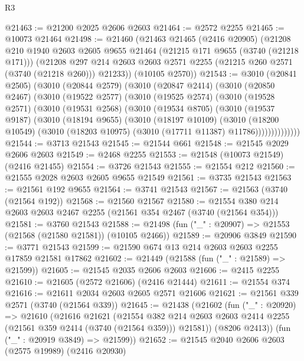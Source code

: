 \begin{lexlean}{R3}
\begin{coremodule}
@21463 := @21200 @2025 @2606 @2603
@21464 := @2572 @2255
@21465 := @10073 @21464
@21498 := @21460
    (@21463
      @21465
      (@2416 @20905)
      (@21208
        @210
        @1940
        @2603
        @2605
        @9655
        @21464
        (@21215 @171 @9655 (@3740 (@21218 @171)))
        (@21208 @297 @214 @2603 @2603 @2571 @2255 (@21215 @260 @2571 (@3740 (@21218 @260))) @21233))
      (@10105 @2570))
@21543 := @3010
    (@20841 @2505)
    (@3010
      (@20844 @2579)
      (@3010
        (@20847 @2414)
        (@3010
          (@20850 @2467)
          (@3010
            (@19522 @2577)
            (@3010
              (@19525 @2574)
              (@3010
                (@19528 @2571)
                (@3010
                  (@19531 @2568)
                  (@3010
                    (@19534 @8705)
                    (@3010
                      (@19537 @9187)
                      (@3010
                        (@18194 @9655)
                        (@3010
                          (@18197 @10109)
                          (@3010
                            (@18200 @10549)
                            (@3010 (@18203 @10975) (@3010 (@17711 @11387) @11786))))))))))))))
@21544 := @3713 @21543
@21545 := @21544 @661
@21548 := @21545 @2029 @2606 @2603
@21549 := @2468 @2255
@21553 := @21548 (@10073 @21549) (@2416 @21455)
@21554 := @3726 @21543
@21555 := @21554 @212
@21560 := @21555 @2028 @2603 @2605 @9655 @21549
@21561 := @3735 @21543
@21563 := @21561 @192 @9655
@21564 := @3741 @21543
@21567 := @21563 (@3740 (@21564 @192))
@21568 := @21560 @21567
@21580 := @21554 @380 @214 @2603 @2603 @2467 @2255 (@21561 @354 @2467 (@3740 (@21564 @354)))
@21581 := @3760 @21543
@21588 := @21498 (fun ("_" : @20907) => @21553 (@21568 (@21580 @21581)) (@10105 @2466))
@21589 := @20906 @3849
@21590 := @3771 @21543
@21599 := @21590 @674 @13 @214 @2603 @2603 @2255 @17859 @21581 @17862
@21602 := @21449 (@21588 (fun ("_" : @21589) => @21599))
@21605 := @21545 @2035 @2606 @2603
@21606 := @2415 @2255
@21610 := @21605 (@2572 @21606) (@2416 @21444)
@21611 := @21554 @374
@21616 := @21611 @2034 @2603 @2605 @2571 @21606
@21621 := @21561 @339 @2571 (@3740 (@21564 @339))
@21645 := @21438
    (@21602
      (fun ("_" : @20920) =>
      @21610
        (@21616
          @21621
          (@21554
            @382
            @214
            @2603
            @2603
            @2414
            @2255
            (@21561 @359 @2414 (@3740 (@21564 @359)))
            @21581))
        (@8206 @2413))
      (fun ("_" : @20919 @3849) => @21599))
@21652 := @21545 @2040 @2606 @2603 (@2575 @19989) (@2416 @20930)

\end{coremodule}
\end{lexlean}
